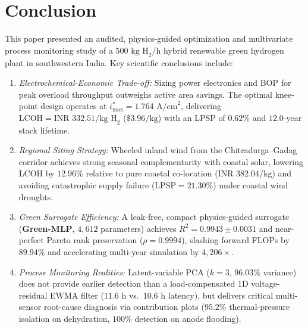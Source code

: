 \documentclass[conference]{IEEEtran}
\begin{document}
\section{Conclusion}
This paper presented an audited, physics-guided optimization and multivariate process monitoring study of a $500\text{ kg H}_2/\text{h}$ hybrid renewable green hydrogen plant in southwestern India. Key scientific conclusions include:
\begin{enumerate}
    \item \textit{Electrochemical-Economic Trade-off:} Sizing power electronics and BOP for peak overload throughput outweighs active area savings. The optimal knee-point design operates at $i_{\max}^* = 1.764\text{ A/cm}^2$, delivering $\text{LCOH} = \text{INR } 332.51/\text{kg H}_2$ (\$$3.96/\text{kg}$) with an LPSP of $0.62\%$ and $12.0$-year stack lifetime.
    \item \textit{Regional Siting Strategy:} Wheeled inland wind from the Chitradurga--Gadag corridor achieves strong seasonal complementarity with coastal solar, lowering LCOH by $12.96\%$ relative to pure coastal co-location ($\text{INR } 382.04/\text{kg}$) and avoiding catastrophic supply failure ($\text{LPSP} = 21.30\%$) under coastal wind droughts.
    \item \textit{Green Surrogate Efficiency:} A leak-free, compact physics-guided surrogate (\textbf{Green-MLP}, $4,612$ parameters) achieves $R^2 = 0.9943 \pm 0.0031$ and near-perfect Pareto rank preservation ($\rho = 0.9994$), slashing forward FLOPs by $89.94\%$ and accelerating multi-year simulation by $4,206\times$.
    \item \textit{Process Monitoring Realities:} Latent-variable PCA ($k=3$, $96.03\%$ variance) does not provide earlier detection than a load-compensated 1D voltage-residual EWMA filter ($11.6\text{ h}$ vs.\ $10.6\text{ h}$ latency), but delivers critical multi-sensor root-cause diagnosis via contribution plots ($95.2\%$ thermal-pressure isolation on dehydration, $100\%$ detection on anode flooding).
\end{enumerate}
\end{document}
